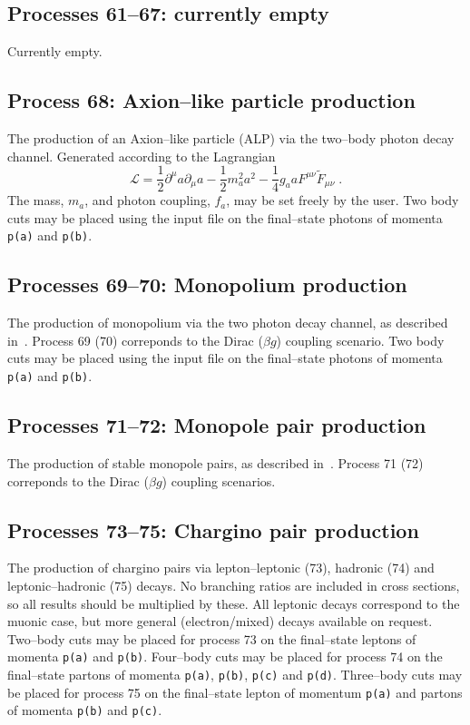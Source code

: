 \documentclass[12pt]{article}
\begin{document}
\subsection{Processes 61--67: currently empty}

Currently empty.

\subsection{Process 68: Axion--like particle production}

The production of an Axion--like particle (ALP) via the two--body photon decay channel. Generated according to the Lagrangian
\begin{equation}
\mathcal{L}=\frac{1}{2}\partial^\mu a \partial_\mu a -\frac{1}{2}m_a^2 a^2 -\frac{1}{4}g_a a F^{\mu\nu}\tilde{F}_{\mu\nu}\;.
\end{equation}
The mass, $m_a$, and photon coupling, $f_a$, may be set freely by the user.  Two body cuts may be placed using the input file on the final--state
 photons of momenta  \texttt{p(a)} and \texttt{p(b)}.

\subsection{Processes 69--70: Monopolium production}

The production of monopolium via the two photon decay channel, as described in~\cite{Epele:2012jn}. Process 69 (70) correponds to the Dirac 
($\beta g$) coupling scenario. Two body cuts may be placed using the input file on the final--state photons of momenta  \texttt{p(a)} and \texttt{p(b)}.  

\subsection{Processes 71--72: Monopole pair production}

The production of stable monopole pairs, as described in~\cite{Epele:2012jn}. Process 71 (72) correponds to the Dirac ($\beta g$) coupling 
scenarios.

\subsection{Processes 73--75: Chargino pair production}

The production of chargino pairs via lepton--leptonic (73), hadronic (74) and leptonic--hadronic (75) decays. No branching ratios are included in 
cross sections, so all results should be multiplied by these. All leptonic decays correspond to the muonic case, but more general (electron/mixed) 
decays available on request. Two--body cuts may be placed for process 73 on the final--state leptons of momenta  \texttt{p(a)} and \texttt{p(b)}. 
Four--body cuts may be placed for process 74 on the final--state partons of momenta  \texttt{p(a)}, \texttt{p(b)}, \texttt{p(c)} and \texttt{p(d)}. 
Three--body cuts may be placed for process 75 on the final--state lepton of momentum  \texttt{p(a)} and partons of momenta \texttt{p(b)} and \texttt{p(c)}.
\end{document}

